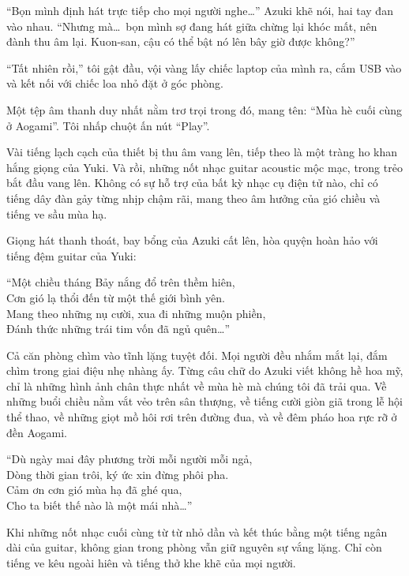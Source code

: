 \documentclass[../main.tex]{subfiles}
\begin{document}
``Bọn mình định hát trực tiếp cho mọi người nghe\dots'' Azuki khẽ nói, hai tay đan vào nhau. ``Nhưng mà\dots\ bọn mình sợ đang hát giữa chừng lại khóc mất, nên đành thu âm lại. Kuon-san, cậu có thể bật nó lên bây giờ được không?''

``Tất nhiên rồi,'' tôi gật đầu, vội vàng lấy chiếc laptop của mình ra, cắm USB vào và kết nối với chiếc loa nhỏ đặt ở góc phòng.

Một tệp âm thanh duy nhất nằm trơ trọi trong đó, mang tên: ``Mùa hè cuối cùng ở Aogami''. Tôi nhấp chuột ấn nút ``Play''.

Vài tiếng lạch cạch của thiết bị thu âm vang lên, tiếp theo là một tràng ho khan hắng giọng của Yuki. Và rồi, những nốt nhạc guitar acoustic mộc mạc, trong trẻo bắt đầu vang lên. Không có sự hỗ trợ của bất kỳ nhạc cụ điện tử nào, chỉ có tiếng dây đàn gảy từng nhịp chậm rãi, mang theo âm hưởng của gió chiều và tiếng ve sầu mùa hạ.

Giọng hát thanh thoát, bay bổng của Azuki cất lên, hòa quyện hoàn hảo với tiếng đệm guitar của Yuki:

\begin{center}
  ``Một chiều tháng Bảy nắng đổ trên thềm hiên,\\
  Cơn gió lạ thổi đến từ một thế giới bình yên.\\
  Mang theo những nụ cười, xua đi những muộn phiền,\\
  Đánh thức những trái tim vốn đã ngủ quên\dots''
\end{center}

Cả căn phòng chìm vào tĩnh lặng tuyệt đối. Mọi người đều nhắm mắt lại, đắm chìm trong giai điệu nhẹ nhàng ấy. Từng câu chữ do Azuki viết không hề hoa mỹ, chỉ là những hình ảnh chân thực nhất về mùa hè mà chúng tôi đã trải qua. Về những buổi chiều nằm vắt vẻo trên sân thượng, về tiếng cười giòn giã trong lễ hội thể thao, về những giọt mồ hôi rơi trên đường đua, và về đêm pháo hoa rực rỡ ở đền Aogami.

\begin{center}
  ``Dù ngày mai đây phương trời mỗi người mỗi ngả,\\
  Dòng thời gian trôi, ký ức xin đừng phôi pha.\\
  Cảm ơn cơn gió mùa hạ đã ghé qua,\\
  Cho ta biết thế nào là một mái nhà\dots''
\end{center}

Khi những nốt nhạc cuối cùng từ từ nhỏ dần và kết thúc bằng một tiếng ngân dài của guitar, không gian trong phòng vẫn giữ nguyên sự vắng lặng. Chỉ còn tiếng ve kêu ngoài hiên và tiếng thở khe khẽ của mọi người.
\end{document}
